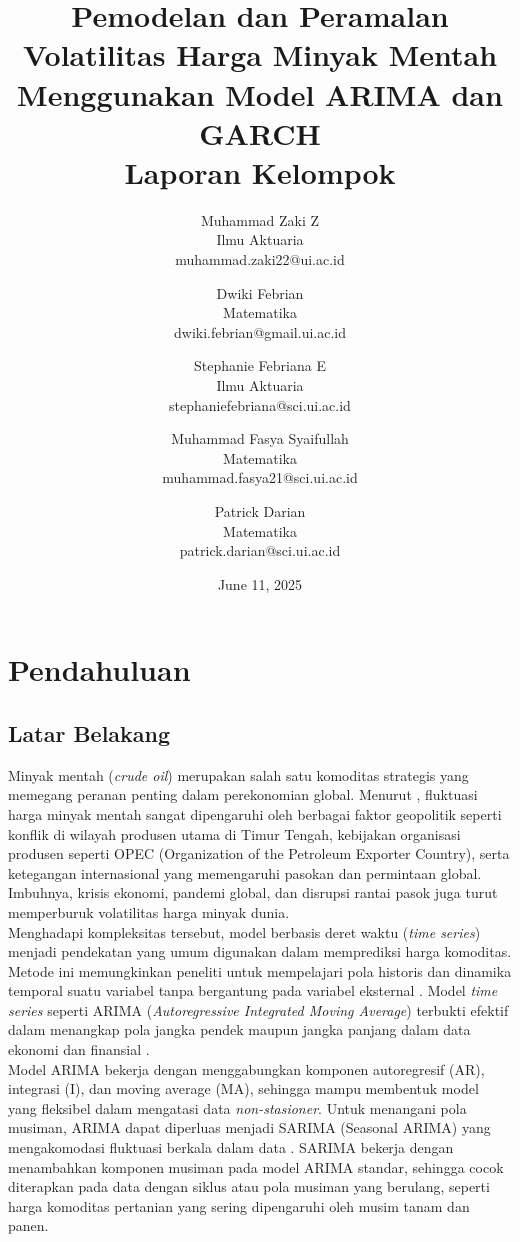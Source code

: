 \documentclass[a4paper,12pt]{article}
\title{
\bf Pemodelan dan Peramalan Volatilitas Harga Minyak Mentah Menggunakan Model ARIMA dan GARCH \\
\vspace{0.5em}
\large Laporan Kelompok
}
\author{
Muhammad Zaki Z \\[1ex] 
\small Ilmu Aktuaria \\
\small muhammad.zaki22@ui.ac.id
\and
Dwiki Febrian \\[1ex]
\small Matematika \\
\small dwiki.febrian@gmail.ui.ac.id
\and
Stephanie Febriana E \\[1ex]
\small Ilmu Aktuaria \\
\small stephaniefebriana@sci.ui.ac.id
\and
Muhammad Fasya Syaifullah\\[1ex]
\small Matematika \\
\small muhammad.fasya21@sci.ui.ac.id
\and
Patrick Darian \\[1ex]
\small Matematika \\
\small patrick.darian@sci.ui.ac.id
}
\date{June 11, 2025}
\begin{document}
\setlength{\parindent}{0 cm}

\maketitle

\newpage
\section{Pendahuluan}

\subsection{Latar Belakang}
Minyak mentah (\textit{crude oil}) merupakan salah satu komoditas strategis yang memegang peranan penting dalam perekonomian global. Menurut \parencite{baumeister2016forty}, fluktuasi harga minyak mentah sangat dipengaruhi oleh berbagai faktor geopolitik seperti konflik di wilayah produsen utama di Timur Tengah, kebijakan organisasi produsen seperti OPEC (Organization of the Petroleum Exporter Country), serta ketegangan internasional yang memengaruhi pasokan dan permintaan global. Imbuhnya, krisis ekonomi, pandemi global, dan disrupsi rantai pasok juga turut memperburuk volatilitas harga minyak dunia. \\

Menghadapi kompleksitas tersebut, model berbasis deret waktu (\textit{time series}) menjadi pendekatan yang umum digunakan dalam memprediksi harga komoditas. Metode ini memungkinkan peneliti untuk mempelajari pola historis dan dinamika temporal suatu variabel tanpa bergantung pada variabel eksternal \parencite{hyndman2018forecasting}. Model \textit{time series} seperti ARIMA (\textit{Autoregressive Integrated Moving Average}) terbukti efektif dalam menangkap pola jangka pendek maupun jangka panjang dalam data ekonomi dan finansial \parencite{box2015time}. \\

Model ARIMA bekerja dengan menggabungkan komponen autoregresif (AR), integrasi (I), dan moving average (MA), sehingga mampu membentuk model yang fleksibel dalam mengatasi data \textit{non-stasioner}. Untuk menangani pola musiman, ARIMA dapat diperluas menjadi SARIMA (Seasonal ARIMA) yang mengakomodasi fluktuasi berkala dalam data \parencite{makridakis2018statistical}. SARIMA bekerja dengan menambahkan komponen musiman pada model ARIMA standar, sehingga cocok diterapkan pada data dengan siklus atau pola musiman yang berulang, seperti harga komoditas pertanian yang sering dipengaruhi oleh musim tanam dan panen. \\
\end{document}
